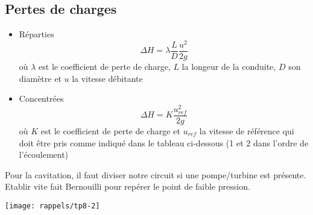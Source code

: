 \subsection*{Pertes de charges}
\begin{itemize}
	\item Réparties
	      \begin{equation}
	      	\Delta H = \lambda \frac{L}{D}\frac{u^2}{2g}
	      \end{equation}
	      où $\lambda$ est le coefficient de perte de charge, $L$ la longeur de la conduite, $D$ son diamètre et $u$ la vitesse débitante
	      	
	\item Concentrées
	      \begin{equation}
	      	\Delta H = K \frac{u^2_{ref}}{2g}
	      \end{equation}
	      où $K$ est le coefficient de perte de charge et $u_{ref}$ la vitesse de référence qui doit être pris comme indiqué dans le tableau ci-dessous (1 et 2 dans l'ordre de l'écoulement)
\end{itemize}	
Pour la cavitation, il faut diviser notre circuit si une pompe/turbine est présente. Etablir vite fait Bernouilli pour repérer le point de faible pression. \\

\begin{center}
	\texttt{[image: rappels/tp8-2]}
\end{center}
